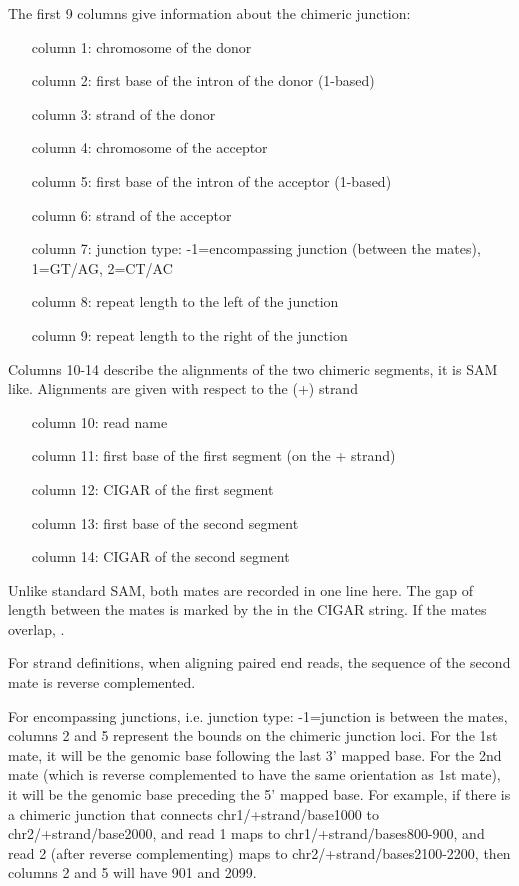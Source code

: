 \documentclass[12pt]{article}
\begin{document}
The first 9 columns give information about the chimeric junction:
\begin{itemize}[leftmargin=1in]
\item[column 1:] chromosome of the donor
\item[column 2:] first base of the intron of the donor (1-based)
\item[column 3:] strand of the donor
\item[column 4:] chromosome of the acceptor
\item[column 5:] first base of the intron of the acceptor (1-based)
\item[column 6:] strand of the acceptor
\item[column 7:] junction type: -1=encompassing junction (between the mates), 1=GT/AG, 2=CT/AC
\item[column 8:] repeat length to the left of the junction
\item[column 9:] repeat length to the right of the junction
\end{itemize}

Columns 10-14 describe the alignments of the two chimeric segments, it is SAM like. Alignments are given with respect to the (+) strand
\begin{itemize}[leftmargin=1in]
\item[column 10:] read name
\item[column 11:] first base of the first segment (on the + strand)
\item[column 12:] CIGAR of the first segment
\item[column 13:] first base of the second segment
\item[column 14:] CIGAR of the second segment
\end{itemize}

Unlike standard SAM, both mates are recorded in one line here. The gap of length   between the mates is marked by the  in the CIGAR string.
If the mates overlap, . 

For strand definitions, when aligning paired end reads, the sequence of the second mate is reverse complemented.

For encompassing junctions, i.e. junction type: -1=junction is between the mates, columns 2 and 5 represent the bounds on the chimeric junction loci. For the 1st mate, it will be the genomic base following the last 3' mapped base. For the 2nd mate (which is reverse complemented to have the same orientation as 1st mate), it will be the genomic base preceding the 5' mapped base. For example, if there is a chimeric junction that connects chr1/+strand/base1000 to chr2/+strand/base2000, and read 1 maps to chr1/+strand/bases800-900, and read 2 (after reverse complementing) maps to chr2/+strand/bases2100-2200, then columns 2 and 5 will have 901 and 2099.
\end{document}
